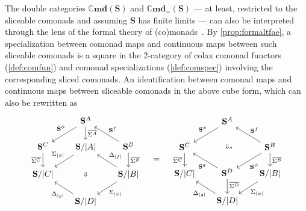 \documentclass[11pt, oneside, article]{memoir}
\theoremstyle{plain}
\theoremstyle{definition}
\theoremstyle{remark}
\newenvironment{remark}
{\renewcommand\qedsymbol{$\lrcorner$}%
  \pushQED{\qed}\myremark}
{\popQED\endmyremark}
\DeclarePairedDelimiter{\abs}{\lvert}{\rvert}
\newcommand{\namedcat}[1]{\mathbf{#1}}
\newcommand{\cat}[1]{\mathbf{#1}}
\newcommand{\Cmd}{\mathbb{C}\namedcat{md}}
\newcommand{\CmdId}{\Cmd_=}
\newcommand{\CoalgOn}[2]{{#2}^{#1}}
\newcommand{\CoalgS}[1]{\CoalgOn{#1}{\bS}}
\newcommand{\pts}[1]{{\abs{#1}}}
\newcommand{\one}[1]{\pts{#1}}
\newcommand{\ptlift}[1]{\overline{#1}}
\newcommand{\carr}{\Sigma}
\newcommand{\leindex}[1]{\Sigma_{#1}}
\newcommand{\reindex}[1]{\Delta_{#1}}
\newcommand{\car}[1]{\carr^{#1}}
\newcommand{\carA}{\car{\cA}}
\newcommand{\carB}{\car{\cB}}
\newcommand{\carC}{\car{\cC}}
\newcommand{\carD}{\car{\cD}}
\newcommand{\com}[2]{{#1}^{#2}}
\newcommand{\con}[2]{{#1}^{#2}}
\newcommand{\cmnd}[1]{{#1}}
\newcommand{\cA}{\cmnd{A}}
\newcommand{\cB}{\cmnd{B}}
\newcommand{\cC}{\cmnd{C}}
\newcommand{\cD}{\cmnd{D}}
\newcommand{\bS}{\cat{S}}
\newcommand{\AS}{\CoalgS{\cA}}
\newcommand{\BS}{\CoalgS{\cB}}
\newcommand{\CS}{\CoalgS{\cC}}
\newcommand{\DS}{\CoalgS{\cD}}
\newcommand{\SA}{\bS/\pts{\cA}}
\newcommand{\SB}{\bS/\pts{\cB}}
\newcommand{\SC}{\bS/\pts{\cC}}
\newcommand{\SD}{\bS/\pts{\cD}}
\begin{document}
\begin{remark}\label{rem:doubleslice}
  The double categories $\Cmd(\bS)$ and $\CmdId(\bS)$ --- at least,
  restricted to the sliceable comonads and assuming $\bS$ has finite
  limits --- can also be interpreted through the lens of the formal
  theory of (co)monads~\cite{street:monads,lack-street}. By
  \cref{prop:formaltfae}, a specialization between comonad maps and
  continuous maps between such sliceable comonads is a square in the
  2-category of colax comonad functors (\cref{def:comfun}) and comonad
  specializations (\cref{def:comspec}) involving the corresponding
  sliced comonads. An identification between comonad maps and
  continuous maps between sliceable comonads in the above cube form,
  which can also be rewritten as
  \[
    \begin{tikzcd}[column sep=17, row sep=15]
      & \AS & \\
      \CS & \SA & \BS \\
      \SC && \SB \\
      & \SD
      \arrow["{\com{\bS}{\phi}}"', pos=.4, from=1-2, to=2-1]
      \arrow["{\ptlift{\carA}}", from=1-2, to=2-2]
      \arrow["{\ptlift{\carC}}"', from=2-1, to=3-1]
      \arrow["{\leindex{\one{\phi}}}"', pos=.4, from=2-2, to=3-1]
      \arrow["\Downarrow"{description}, draw=none, from=2-2, to=4-2]
      \arrow["{\con{\bS}{f}}"', from=2-3, to=1-2]
      \arrow["{\ptlift{\carB}}", from=2-3, to=3-3]
      \arrow["{\reindex{\one{f}}}"', from=3-3, to=2-2]
      \arrow["{\leindex{\one{\psi}}}", from=3-3, to=4-2]
      \arrow["{\reindex{\one{g}}}", pos=.4, from=4-2, to=3-1]
    \end{tikzcd}
    \quad=\quad
    \begin{tikzcd}[column sep=17, row sep=15]
      & \AS & \\
      \CS && \BS \\
      \SC & \DS & \SB \\
      & \SD
      \arrow["{\com{\bS}{\phi}}"', pos=.4, from=1-2, to=2-1]
      \arrow["{\Downarrow_\sigma}"{description}, shift left, draw=none, from=1-2, to=3-2]
      \arrow["{\ptlift{\carC}}"', from=2-1, to=3-1]
      \arrow["{\con{\bS}{f}}"', from=2-3, to=1-2]
      \arrow["{\com{\bS}{\psi}}", pos=.55, from=2-3, to=3-2]
      \arrow["{\ptlift{\carB}}", from=2-3, to=3-3]
      \arrow["{\con{\bS}{g}}", pos=.4, from=3-2, to=2-1]
      \arrow["{\ptlift{\carD}}", pos=.4, from=3-2, to=4-2]
      \arrow["{\leindex{\one{\psi}}}", from=3-3, to=4-2]
      \arrow["{\reindex{\one{g}}}", pos=.4, from=4-2, to=3-1]
    \end{tikzcd}
\]
\end{remark}
\end{document}

